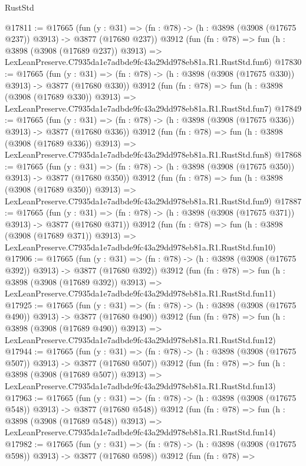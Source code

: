 \begin{lexlean}{RustStd}
\begin{coremodule}
@17811 := @17665
    (fun (y : @31) => (fn : @78) -> (h : @3898 (@3908 (@17675 @237)) @3913) -> @3877 (@17680 @237))
    @3912
    (fun (fn : @78) =>
    fun (h : @3898 (@3908 (@17689 @237)) @3913) =>
    LexLeanPreserve.C7935da1e7adbde9fc43a29dd978eb81a.R1.RustStd.fun6)
@17830 := @17665
    (fun (y : @31) => (fn : @78) -> (h : @3898 (@3908 (@17675 @330)) @3913) -> @3877 (@17680 @330))
    @3912
    (fun (fn : @78) =>
    fun (h : @3898 (@3908 (@17689 @330)) @3913) =>
    LexLeanPreserve.C7935da1e7adbde9fc43a29dd978eb81a.R1.RustStd.fun7)
@17849 := @17665
    (fun (y : @31) => (fn : @78) -> (h : @3898 (@3908 (@17675 @336)) @3913) -> @3877 (@17680 @336))
    @3912
    (fun (fn : @78) =>
    fun (h : @3898 (@3908 (@17689 @336)) @3913) =>
    LexLeanPreserve.C7935da1e7adbde9fc43a29dd978eb81a.R1.RustStd.fun8)
@17868 := @17665
    (fun (y : @31) => (fn : @78) -> (h : @3898 (@3908 (@17675 @350)) @3913) -> @3877 (@17680 @350))
    @3912
    (fun (fn : @78) =>
    fun (h : @3898 (@3908 (@17689 @350)) @3913) =>
    LexLeanPreserve.C7935da1e7adbde9fc43a29dd978eb81a.R1.RustStd.fun9)
@17887 := @17665
    (fun (y : @31) => (fn : @78) -> (h : @3898 (@3908 (@17675 @371)) @3913) -> @3877 (@17680 @371))
    @3912
    (fun (fn : @78) =>
    fun (h : @3898 (@3908 (@17689 @371)) @3913) =>
    LexLeanPreserve.C7935da1e7adbde9fc43a29dd978eb81a.R1.RustStd.fun10)
@17906 := @17665
    (fun (y : @31) => (fn : @78) -> (h : @3898 (@3908 (@17675 @392)) @3913) -> @3877 (@17680 @392))
    @3912
    (fun (fn : @78) =>
    fun (h : @3898 (@3908 (@17689 @392)) @3913) =>
    LexLeanPreserve.C7935da1e7adbde9fc43a29dd978eb81a.R1.RustStd.fun11)
@17925 := @17665
    (fun (y : @31) => (fn : @78) -> (h : @3898 (@3908 (@17675 @490)) @3913) -> @3877 (@17680 @490))
    @3912
    (fun (fn : @78) =>
    fun (h : @3898 (@3908 (@17689 @490)) @3913) =>
    LexLeanPreserve.C7935da1e7adbde9fc43a29dd978eb81a.R1.RustStd.fun12)
@17944 := @17665
    (fun (y : @31) => (fn : @78) -> (h : @3898 (@3908 (@17675 @507)) @3913) -> @3877 (@17680 @507))
    @3912
    (fun (fn : @78) =>
    fun (h : @3898 (@3908 (@17689 @507)) @3913) =>
    LexLeanPreserve.C7935da1e7adbde9fc43a29dd978eb81a.R1.RustStd.fun13)
@17963 := @17665
    (fun (y : @31) => (fn : @78) -> (h : @3898 (@3908 (@17675 @548)) @3913) -> @3877 (@17680 @548))
    @3912
    (fun (fn : @78) =>
    fun (h : @3898 (@3908 (@17689 @548)) @3913) =>
    LexLeanPreserve.C7935da1e7adbde9fc43a29dd978eb81a.R1.RustStd.fun14)
@17982 := @17665
    (fun (y : @31) => (fn : @78) -> (h : @3898 (@3908 (@17675 @598)) @3913) -> @3877 (@17680 @598))
    @3912
    (fun (fn : @78) =>

\end{coremodule}
\end{lexlean}
